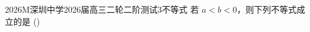 
\begin{problem}{2026}{M}{深圳中学2026届高三二轮二阶测试}{3}{不等式}
若 $a<b<0$，则下列不等式成立的是 (\hspace{1cm})
\begin{choices}
\end{choices}
\end{problem}